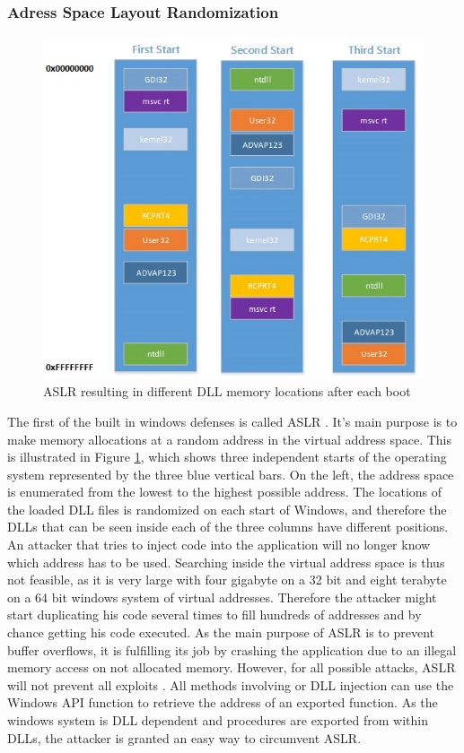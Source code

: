 \subsubsection{Adress Space Layout Randomization}
\begin{figure}[!htbp]
\centering
\includegraphics[width=\textwidth,height=\textheight,keepaspectratio]{sections/background/defenses/aslr.jpg}
\caption{\gls{ASLR} resulting in different DLL memory locations after each boot}
\label{fig:aslr}
\end{figure}
The first of the built in windows defenses is called \gls{ASLR} \cite{miller2009method}. It's main purpose is to make memory allocations at a random address in the virtual address space. This is illustrated in Figure \ref{fig:aslr}, which shows three independent starts of the operating system represented by the three blue vertical bars. On the left, the address space is enumerated from the lowest to the highest possible address. The locations of the loaded \gls{DLL} files is randomized on each start of Windows, and therefore the \glspl{DLL} that can be seen inside each of the three columns have different positions. An attacker that tries to inject code into the application will no longer know which address has to be used. Searching inside the virtual address space is thus not feasible, as it is very large with four gigabyte on a 32 bit and eight terabyte on a 64 bit windows system of virtual addresses. Therefore the attacker might start duplicating his code several times to fill hundreds of addresses and by chance getting his code executed. As the main purpose of \gls{ASLR} is to prevent buffer overflows, it is fulfilling its job by crashing the application due to an illegal memory access on not allocated memory. However, for all possible attacks, \gls{ASLR} will not prevent all exploits \cite{shacham}. All methods involving  or \gls{DLL} injection can use the Windows \gls{API} function  to retrieve the address of an exported function. As the windows system is \gls{DLL} dependent and procedures are exported from within \glspl{DLL}, the attacker is granted an easy way to circumvent \gls{ASLR}.